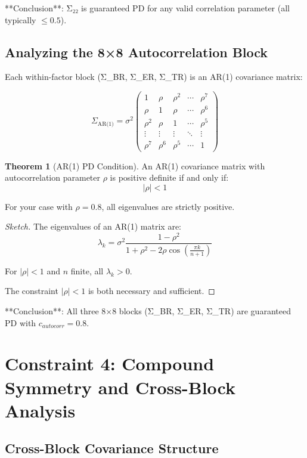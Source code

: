 \documentclass[12pt,a4paper]{article}
\theoremstyle{definition}
\newtheorem{theorem}{Theorem}
\begin{document}
**Conclusion**: Σ₂₂ is guaranteed PD for any valid correlation parameter (all typically $\leq 0.5$).

\subsection{Analyzing the 8×8 Autocorrelation Block}

Each within-factor block (Σ_BR, Σ_ER, Σ_TR) is an AR(1) covariance matrix:

\[
  \Sigma_{\text{AR(1)}} = \sigma^2 \begin{pmatrix}
    1 & \rho & \rho^2 & \cdots & \rho^7 \\
    \rho & 1 & \rho & \cdots & \rho^6 \\
    \rho^2 & \rho & 1 & \cdots & \rho^5 \\
    \vdots & \vdots & \vdots & \ddots & \vdots \\
    \rho^7 & \rho^6 & \rho^5 & \cdots & 1
  \end{pmatrix}
\]

\begin{theorem}[AR(1) PD Condition]
An AR(1) covariance matrix with autocorrelation parameter $\rho$ is positive definite if and only if:
\[
  |\rho| < 1
\]

For your case with $\rho = 0.8$, all eigenvalues are strictly positive.
\end{theorem}

\begin{proof}[Sketch]
The eigenvalues of an AR(1) matrix are:
\[
  \lambda_k = \sigma^2 \frac{1 - \rho^2}{1 + \rho^2 - 2\rho \cos\left(\frac{\pi k}{n+1}\right)}
\]

For $|\rho| < 1$ and $n$ finite, all $\lambda_k > 0$.

The constraint $|\rho| < 1$ is both necessary and sufficient.
\end{proof}

**Conclusion**: All three 8×8 blocks (Σ_BR, Σ_ER, Σ_TR) are guaranteed PD with $c_{autocorr} = 0.8$.

\section{Constraint 4: Compound Symmetry and Cross-Block Analysis}

\subsection{Cross-Block Covariance Structure}
\end{document}
